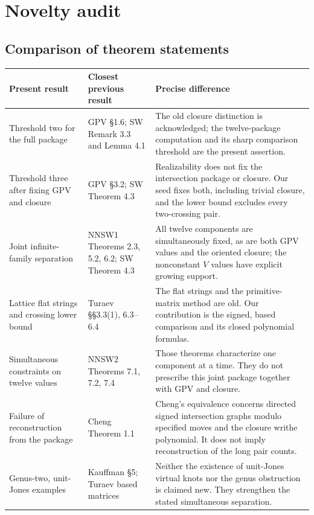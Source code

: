 \documentclass[12pt]{amsart}
\theoremstyle{definition}
\theoremstyle{remark}
\numberwithin{equation}{section}
\begin{document}
\section{Novelty audit}\label{en:audit}
\subsection{Comparison of theorem statements}
\begin{longtable}{p{}p{}p{}}
\toprule Present result&Closest previous result&Precise difference\\\midrule
\endhead
Threshold two for the full package&GPV \S1.6; SW Remark 3.3 and Lemma 4.1&The old closure distinction is acknowledged; the twelve-package computation and its sharp comparison threshold are the present assertion.\\[3pt]
Threshold three after fixing GPV and closure&GPV \S3.2; SW Theorem 4.3&Realizability does not fix the intersection package or closure. Our seed fixes both, including trivial closure, and the lower bound excludes every two-crossing pair.\\[3pt]
Joint infinite-family separation&NNSW1 Theorems 2.3, 5.2, 6.2; SW Theorem 4.3&All twelve components are simultaneously fixed, as are both GPV values and the oriented closure; the nonconstant $V$ values have explicit growing support.\\[3pt]
Lattice flat strings and crossing lower bound&Turaev \S\S3.3(1), 6.3--6.4&The flat strings and the primitive-matrix method are old. Our contribution is the signed, based comparison and its closed polynomial formulas.\\[3pt]
Simultaneous constraints on twelve values&NNSW2 Theorems 7.1, 7.2, 7.4&Those theorems characterize one component at a time. They do not prescribe this joint package together with GPV and closure.\\[3pt]
Failure of reconstruction from the package&Cheng Theorem 1.1&Cheng's equivalence concerns directed signed intersection graphs modulo specified moves and the closure writhe polynomial. It does not imply reconstruction of the long pair counts.\\[3pt]
Genus-two, unit-Jones examples&Kauffman \S5; Turaev based matrices&Neither the existence of unit-Jones virtual knots nor the genus obstruction is claimed new. They strengthen the stated simultaneous separation.\\
\bottomrule
\end{longtable}
\end{document}
